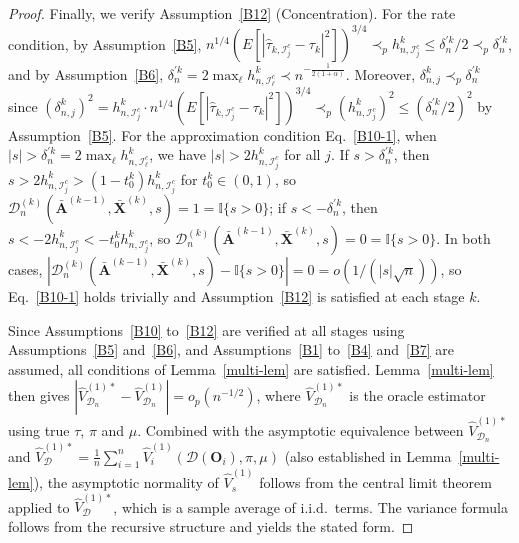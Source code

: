 \documentclass[11pt]{article}
\theoremstyle{referenceplain}
\theoremstyle{referencedefinition}
\theoremstyle{referenceremark}
\begin{document}
\begin{proof}
Finally, we verify Assumption~\ref{B12} (Concentration). For the rate condition, by Assumption~\ref{B5}, $n^{1/4}(E[|\widehat{\tau}_{k,{\mathcal{I}_j^c}}-\tau_k|^2])^{3/4}\prec_p h_{n,{\mathcal{I}_j^c}}^k\leq\delta_n^{\prime k}/2\prec_p\delta_n^{\prime k}$, and by Assumption~\ref{B6}, $\delta_n^{\prime k}=2\max_{{\ell}} h_{n,\mathcal{I}_{{\ell}}^c}^k\prec n^{-\frac{1}{2(1+\alpha)}}$. Moreover, ${\delta_{n,j}^k\prec_p\delta_n^{\prime k}}$ since $({\delta_{n,j}^k})^2=h_{n,\mathcal{I}_j^c}^k\cdot n^{1/4}(E[|\widehat{\tau}_{k,\mathcal{I}_j^c}-\tau_k|^2])^{3/4}\prec_p (h_{n,\mathcal{I}_j^c}^k)^2\leq(\delta_n^{\prime k}/2)^2$ by Assumption~\ref{B5}. For the approximation condition Eq.~\eqref{B10-1}, when $|s|>\delta_n^{\prime k}=2\max_{{\ell}} h_{n,\mathcal{I}_{{\ell}}^c}^k$, we have $|s|>2h_{n,\mathcal{I}_j^c}^k$ for all $j$. If $s>\delta_n^{\prime k}$, then $s>2h_{n,\mathcal{I}_j^c}^k>(1-t_0^k)h_{n,\mathcal{I}_j^c}^k$ for $t_0^k\in(0,1)$, so $\mathcal{D}_n^{(k)}(\bar{\mathbf{A}}^{(k-1)},\bar{\mathbf{X}}^{(k)},s)=1=\mathbb{I}\{s>0\}$; if $s<-\delta_n^{\prime k}$, then $s<-2h_{n,\mathcal{I}_j^c}^k<-t_0^k h_{n,\mathcal{I}_j^c}^k$, so $\mathcal{D}_n^{(k)}(\bar{\mathbf{A}}^{(k-1)},\bar{\mathbf{X}}^{(k)},s)=0=\mathbb{I}\{s>0\}$. In both cases, $|\mathcal{D}_n^{(k)}(\bar{\mathbf{A}}^{(k-1)},\bar{\mathbf{X}}^{(k)},s)-\mathbb{I}\{s>0\}|=0=o(1/({|s|}\sqrt{n}))$, so Eq.~\eqref{B10-1} holds trivially and Assumption~\ref{B12} is satisfied at each stage $k$.

Since Assumptions~\ref{B10} to~\ref{B12} are verified at all stages using Assumptions~\ref{B5} and~\ref{B6}, and Assumptions~\ref{B1} to~\ref{B4} and~\ref{B7} are assumed, all conditions of Lemma~\ref{multi-lem} are satisfied. Lemma~\ref{multi-lem} then gives $|\widehat{V}_{\mathcal{D}_n}^{(1)*}-\widehat{V}_{\mathcal{D}_n}^{(1)}|=o_p(n^{-1/2})$, where $\widehat{V}_{\mathcal{D}_n}^{(1)*}$ is the oracle estimator using true $\tau$, $\pi$ and $\mu$. Combined with the asymptotic equivalence between $\widehat{V}_{\mathcal{D}_n}^{(1)*}$ and $\widehat{V}_{\mathcal{D}}^{(1)*}=\frac{1}{n}\sum_{i=1}^n\widehat{V}_i^{(1)}(\mathcal{D}(\mathbf{O}_i),\pi,\mu)$ (also established in Lemma~\ref{multi-lem}), the asymptotic normality of $\widehat{V}_s^{(1)}$ follows from the central limit theorem applied to $\widehat{V}_{\mathcal{D}}^{(1)*}$, which is a sample average of i.i.d.\ terms. The variance formula follows from the recursive structure and yields the stated form.
\end{proof}
\end{document}
